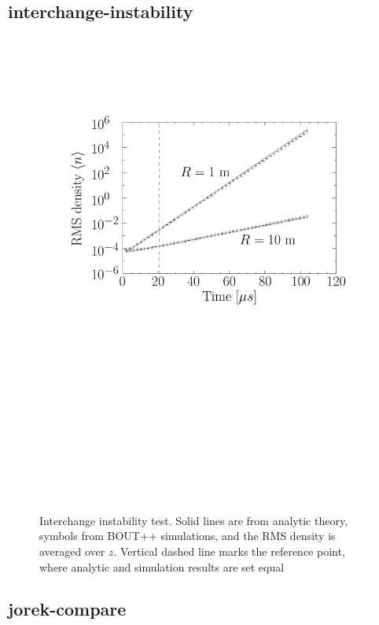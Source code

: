\documentclass[12pt]{article}
\begin{document}
\subsection{interchange-instability}
%
\begin{figure}[htb!]
\centering \includegraphics[scale=0.4]{figs/interchange_inst_test.pdf}
\caption{Interchange instability test. Solid lines are from analytic theory,
symbols from BOUT++ simulations, and the RMS density is averaged over $z$.
Vertical dashed line marks the reference point, where analytic and simulation
results are set equal}
%
\label{fig:profiles}
%
\end{figure}
%



\subsection{jorek-compare}
%
\end{document}
